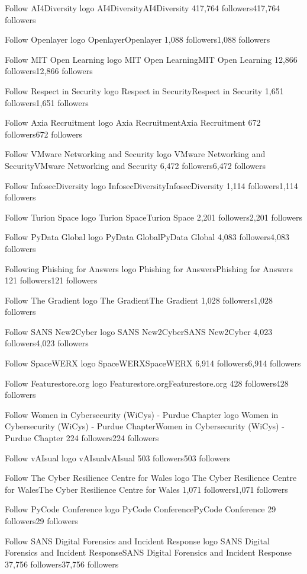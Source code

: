 Follow
AI4Diversity logo
AI4DiversityAI4Diversity
417,764 followers417,764 followers

Follow
Openlayer logo
OpenlayerOpenlayer
1,088 followers1,088 followers

Follow
MIT Open Learning logo
MIT Open LearningMIT Open Learning
12,866 followers12,866 followers

Follow
Respect in Security logo
Respect in SecurityRespect in Security
1,651 followers1,651 followers

Follow
Axia Recruitment logo
Axia RecruitmentAxia Recruitment
672 followers672 followers

Follow
VMware Networking and Security logo
VMware Networking and SecurityVMware Networking and Security
6,472 followers6,472 followers

Follow
InfosecDiversity logo
InfosecDiversityInfosecDiversity
1,114 followers1,114 followers

Follow
Turion Space logo
Turion SpaceTurion Space
2,201 followers2,201 followers

Follow
PyData Global logo
PyData GlobalPyData Global
4,083 followers4,083 followers

Following
Phishing for Answers logo
Phishing for AnswersPhishing for Answers
121 followers121 followers

Follow
The Gradient logo
The GradientThe Gradient
1,028 followers1,028 followers

Follow
SANS New2Cyber logo
SANS New2CyberSANS New2Cyber
4,023 followers4,023 followers

Follow
SpaceWERX logo
SpaceWERXSpaceWERX
6,914 followers6,914 followers

Follow
Featurestore.org logo
Featurestore.orgFeaturestore.org
428 followers428 followers

Follow
Women in Cybersecurity (WiCys) - Purdue Chapter logo
Women in Cybersecurity (WiCys) - Purdue ChapterWomen in Cybersecurity (WiCys) - Purdue Chapter
224 followers224 followers

Follow
vAIsual logo
vAIsualvAIsual
503 followers503 followers

Follow
The Cyber Resilience Centre for Wales logo
The Cyber Resilience Centre for WalesThe Cyber Resilience Centre for Wales
1,071 followers1,071 followers

Follow
PyCode Conference logo
PyCode ConferencePyCode Conference
29 followers29 followers

Follow
SANS Digital Forensics and Incident Response logo
SANS Digital Forensics and Incident ResponseSANS Digital Forensics and Incident Response
37,756 followers37,756 followers

